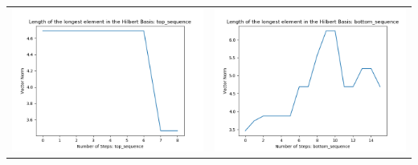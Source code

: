 \documentclass[10pt]{article}
\begin{document}
\begin{tabular}{c|c}
\begin{minipage}{.4\textwidth}
\includegraphics[width=\textwidth]{"DATA/4d/4 generators 2 bound D/top_sequence LENGTH"}
\end{minipage} &
\begin{minipage}{.4\textwidth}
\includegraphics[width=\textwidth]{"DATA/4d/4 generators 2 bound D bottomup/bottom_sequence LENGTH"}
\end{minipage}
\end{tabular}
\end{document}
